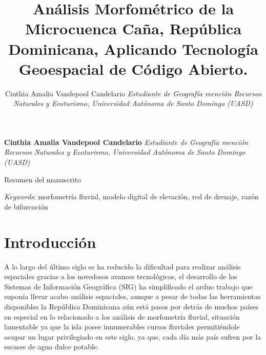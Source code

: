 \documentclass[11pt,]{article}
\title{Análisis Morfométrico de la Microcuenca Caña, República Dominicana,
Aplicando Tecnología Geoespacial de Código Abierto.  }
\author{\Large Cinthia Amalia Vandepool Candelario\vspace{0.05in} \newline\normalsize\emph{Estudiante de Geografía mención Recursos Naturales y Ecoturismo,
Universidad Autónoma de Santo Domingo (UASD)}  }
\date{}
\newcommand*{\authorfont}{\fontfamily{phv}\selectfont}
\renewenvironment{abstract}
 {{%
    \setlength{\leftmargin}{0mm}
    \setlength{\rightmargin}{\leftmargin}%
  }%
  \relax}
 {\endlist}
\begin{document}
	
%

{%
\setlength{\parindent}{0pt}
\thispagestyle{plain}
{\fontsize{18}{20}\selectfont\raggedright 
\maketitle  %

}

{
   \vskip 13.5pt\relax \normalsize\fontsize{11}{12} 
\textbf{\authorfont Cinthia Amalia Vandepool Candelario} \hskip 15pt \emph{\small Estudiante de Geografía mención Recursos Naturales y Ecoturismo,
Universidad Autónoma de Santo Domingo (UASD)}   

}

}








\begin{abstract}

    \hbox{\vrule height .2pt width 39.14pc}

    \vskip 8.5pt %

\noindent Resumen del manuscrito


\vskip 8.5pt \noindent \emph{Keywords}: morfometría fluvial, modelo digital de elevación, red de drenaje, razón
de bifurcación \par

    \hbox{\vrule height .2pt width 39.14pc}



\end{abstract}


\vskip 6.5pt


\noindent  \section{Introducción}\label{introducciuxf3n}

A lo largo del último siglo se ha reducido la dificultad para realizar
análisis espaciales gracias a los novedosos avances tecnológicos, el
desarrollo de los Sistemas de Información Geográfica (SIG) ha
simplificado el arduo trabajo que suponía llevar acabo análisis
espaciales, aunque a pesar de todas las herramientas disponibles la
República Dominicana aún está pasos por detrás de muchos países en
especial en lo relacionado a los análisis de morfometría fluvial,
situación lamentable ya que la isla posee innumerables cursos fluviales
permitiéndole ocupar un lugar privilegiado en este siglo, ya que, cada
día más país sufren por la escases de agua dulce potable.
\end{document}

